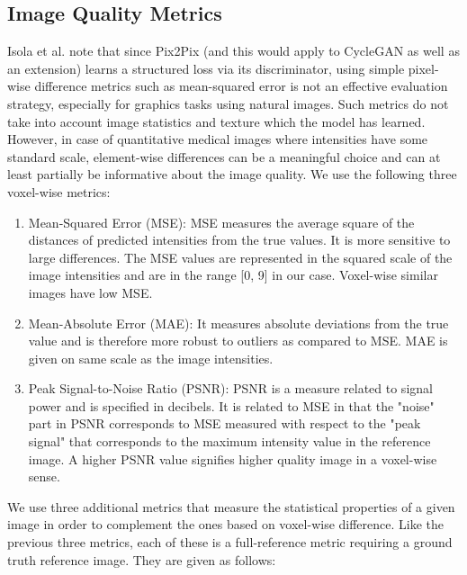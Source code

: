 \subsection{Image Quality Metrics}
\label{image_quality_metrics}
Isola et al. \cite{isola2017image} note that since Pix2Pix (and this would apply to CycleGAN as well as an extension) learns a structured loss via its discriminator, using simple pixel-wise difference metrics such as mean-squared error is not an effective evaluation strategy, especially for graphics tasks using natural images. Such metrics do not take into account image statistics and texture which the model has learned. However, in case of quantitative medical images where intensities have some standard scale, element-wise differences can be a meaningful choice and can at least partially be informative about the image quality. We use the following three voxel-wise metrics:

\begin{enumerate}
    \item Mean-Squared Error (MSE): MSE measures the average square of the distances of predicted intensities from the true values. It is more sensitive to large differences. The MSE values are represented in the squared scale of the image intensities and are in the range [0, 9] in our case. Voxel-wise similar images have low MSE.
    \item Mean-Absolute Error (MAE): It measures absolute deviations from the true value and is therefore more robust to outliers as compared to MSE. MAE is given on same scale as the image intensities.
    \item Peak Signal-to-Noise Ratio (PSNR): PSNR is a measure related to signal power and is specified in decibels. It is related to MSE in that the "noise" part in PSNR corresponds to MSE measured with respect to the "peak signal" that corresponds to the maximum intensity value in the reference image. A higher PSNR value signifies higher quality image in a voxel-wise sense.
\end{enumerate}

We use three additional metrics that measure the statistical properties of a given image in order to complement the ones based on voxel-wise difference. Like the previous three metrics, each of these is a full-reference metric requiring a ground truth reference image. They are given as follows:


